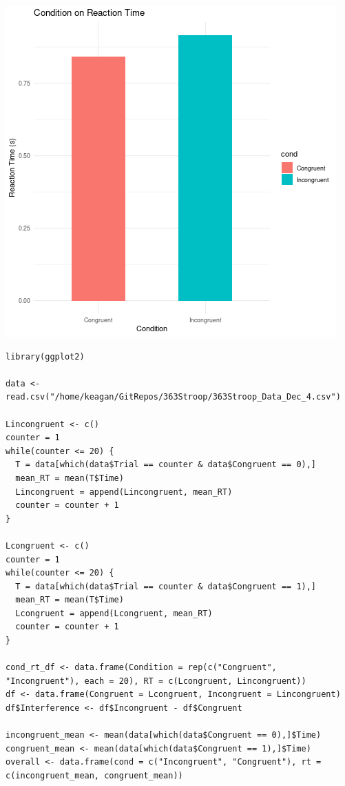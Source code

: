\documentclass{article}
\begin{document}
\begin{center}
\includegraphics[width=.9\linewidth]{barplot_stroop.png}
\end{center}


\begin{verbatim}
library(ggplot2)

data <- read.csv("/home/keagan/GitRepos/363Stroop/363Stroop_Data_Dec_4.csv")

Lincongruent <- c()
counter = 1
while(counter <= 20) {
  T = data[which(data$Trial == counter & data$Congruent == 0),]
  mean_RT = mean(T$Time)
  Lincongruent = append(Lincongruent, mean_RT)
  counter = counter + 1
}

Lcongruent <- c()
counter = 1
while(counter <= 20) {
  T = data[which(data$Trial == counter & data$Congruent == 1),]
  mean_RT = mean(T$Time)
  Lcongruent = append(Lcongruent, mean_RT)
  counter = counter + 1
}

cond_rt_df <- data.frame(Condition = rep(c("Congruent", "Incongruent"), each = 20), RT = c(Lcongruent, Lincongruent))
df <- data.frame(Congruent = Lcongruent, Incongruent = Lincongruent)
df$Interference <- df$Incongruent - df$Congruent

incongruent_mean <- mean(data[which(data$Congruent == 0),]$Time)
congruent_mean <- mean(data[which(data$Congruent == 1),]$Time)
overall <- data.frame(cond = c("Incongruent", "Congruent"), rt = c(incongruent_mean, congruent_mean))

\end{verbatim}
\end{document}

